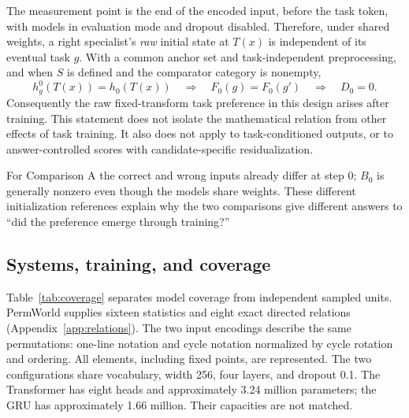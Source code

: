 \documentclass[10pt]{article}
\begin{document}
The measurement point is the end of the encoded input, before the task
token, with models in evaluation mode and dropout disabled. Therefore,
under shared weights, a right specialist's \emph{raw}
initial state at $T(x)$ is independent of its eventual task $g$. With a
common anchor set and task-independent preprocessing, and when $S$ is
defined and the comparator category is nonempty,
\begin{equation}
 h_g^0(T(x))=h_0(T(x))\quad\Longrightarrow\quad
 F_0(g)=F_0(g')\quad\Longrightarrow\quad D_0=0.
 \label{eq:initialnull}
\end{equation}
Consequently the raw fixed-transform task preference in this design arises
after training. This statement does not isolate the mathematical relation
from other effects of task training. It also does not apply to
task-conditioned outputs, or to answer-controlled scores with
candidate-specific residualization.

For Comparison A the correct and wrong inputs already differ at step 0;
$B_0$ is generally nonzero even though the models share weights. These
different initialization references explain why the two comparisons give
different answers to ``did the preference emerge through training?''

\subsection{Systems, training, and coverage}
\label{sec:coverage}
Table~\ref{tab:coverage} separates model coverage from independent sampled
units. PermWorld supplies sixteen statistics and eight exact directed
relations (Appendix~\ref{app:relations}). The two input encodings describe
the same permutations: one-line notation and cycle notation normalized by
cycle rotation and ordering. All elements, including fixed points, are
represented. The two configurations share vocabulary, width 256, four
layers, and dropout 0.1. The Transformer has eight heads and approximately
3.24 million parameters; the GRU has approximately 1.66 million. Their
capacities are not matched.
\end{document}
